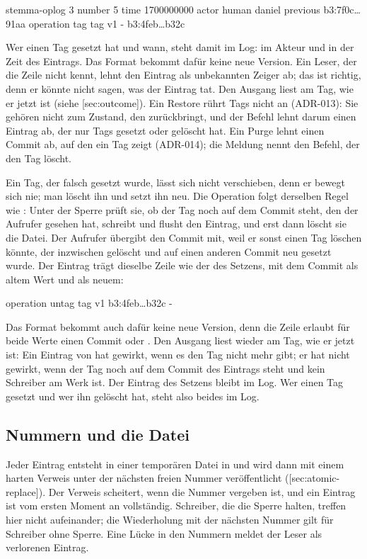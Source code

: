{\starttyping
stemma-oplog 3
number 5
time 1700000000
actor human daniel
previous b3:7f0c…91aa
operation tag
tag v1 - b3:4feb…b32c
\stoptyping

Wer einen Tag gesetzt hat und wann, steht damit im Log: im Akteur und in der Zeit des Eintrags.
Das Format bekommt dafür keine neue Version. Ein Leser, der die Zeile  nicht kennt,
lehnt den Eintrag als unbekannten Zeiger ab; das ist richtig, denn er könnte nicht sagen, was der
Eintrag tat. Den Ausgang liest  am Tag, wie er jetzt ist (siehe
[sec:outcome]). Ein Restore rührt Tags nicht an (ADR-013): Sie gehören
nicht zum Zustand, den  zurückbringt, und der Befehl lehnt darum einen Eintrag
ab, der nur Tags gesetzt oder gelöscht hat. Ein Purge lehnt einen Commit ab, auf den
ein Tag zeigt (ADR-014); die Meldung nennt den Befehl, der den Tag löscht.

Ein Tag, der falsch gesetzt wurde, lässt sich nicht verschieben, denn er bewegt sich nie;
man löscht ihn und setzt ihn neu. Die Operation  folgt derselben Regel wie :
Unter der Sperre prüft sie, ob der Tag noch auf dem Commit steht, den der Aufrufer gesehen hat,
schreibt und flusht den Eintrag, und erst dann löscht sie die Datei. Der Aufrufer übergibt den
Commit mit, weil er sonst einen Tag löschen könnte, der inzwischen gelöscht und auf einen
anderen Commit neu gesetzt wurde. Der Eintrag trägt dieselbe Zeile  wie der des
Setzens, mit dem Commit als altem Wert und \type{-} als neuem:

\starttyping
operation untag
tag v1 b3:4feb…b32c -
\stoptyping

Das Format bekommt auch dafür keine neue Version, denn die Zeile erlaubt für beide Werte einen
Commit oder \type{-}. Den Ausgang liest  wieder am Tag, wie er jetzt ist: Ein Eintrag
von  hat gewirkt, wenn es den Tag nicht mehr gibt; er hat nicht gewirkt, wenn der
Tag noch auf dem Commit des Eintrags steht und kein Schreiber am Werk ist.
Der Eintrag des Setzens bleibt im Log. Wer einen Tag gesetzt und wer ihn gelöscht hat, steht also
beides im Log.

\subsection[sec:oplog-tip]{Nummern und die Datei }

Jeder Eintrag entsteht in einer temporären Datei in 
und wird dann mit einem harten Verweis unter der nächsten freien Nummer veröffentlicht
([sec:atomic-replace]).
Der Verweis scheitert, wenn die Nummer vergeben ist,
und ein Eintrag ist vom ersten Moment an vollständig.
Schreiber, die die Sperre halten, treffen hier nicht aufeinander;
die Wiederholung mit der nächsten Nummer gilt für Schreiber ohne Sperre.
Eine Lücke in den Nummern meldet der Leser als verlorenen Eintrag.

}
